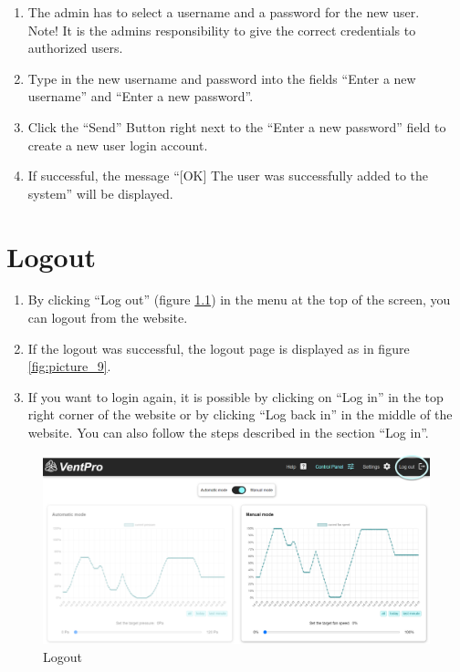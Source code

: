 \begin{enumerate}[wide,  labelwidth=0.3cm,  labelindent=0pt, leftmargin=0.5cm]
\item The admin has to select a username and a password for the new user.\\
\color{red}
Note! It is the admins responsibility to give the correct credentials to authorized users.
\color{black}
\item Type in the new username and password into the fields “Enter a new username” and “Enter a new password”.
\item Click the “Send” Button right next to the “Enter a new password” field to create a new user login account.
\item If successful, the message “[OK] The user was successfully added to the system” will be displayed.
\end{enumerate}



\chapter{Logout}
\label{sec:logout}

\begin{enumerate}[wide,  labelwidth=0.3cm,  labelindent=0pt, leftmargin=0.5cm]
\item By clicking “Log out” (figure \ref{fig:picture_8}) in the menu at the top of the screen, you can logout from the website.
\item If the logout was successful, the logout page is displayed as in figure \ref{fig:picture_9}.
\item If you want to login again, it is possible by clicking on “Log in” in the top right corner of the website
or by clicking “Log back in” in the middle of the website. You can also follow the steps described in the section “Log in”.
\end{enumerate}

\vspace{0.5cm}
\begin{figure}[h]
\centering
\includegraphics[width=1.0\textwidth]{img/Picture8}
\caption{Logout}
\label{fig:picture_8}
\end{figure}

